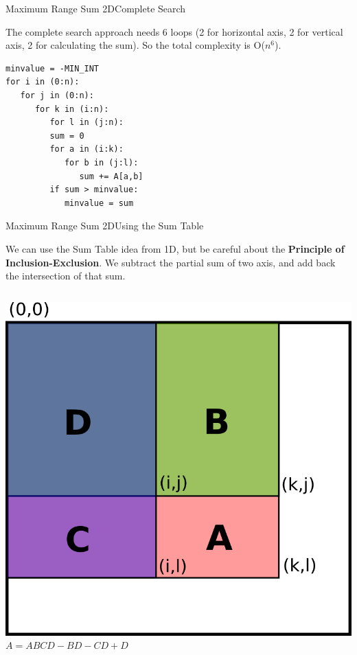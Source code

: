 \begin{frame}[fragile]{Maximum Range Sum 2D}{Complete Search}

\begin{block}{}
  The complete search approach needs 6 loops (2 for horizontal axis, 2 for vertical axis, 2 for calculating the sum). So the total complexity is O($n^6$).
\end{block}

\begin{block}{}
{\smaller
\begin{verbatim}
minvalue = -MIN_INT
for i in (0:n):
   for j in (0:n):
      for k in (i:n):
         for l in (j:n):
         sum = 0
         for a in (i:k):
            for b in (j:l):
               sum += A[a,b]
         if sum > minvalue:
            minvalue = sum
\end{verbatim}
}
\end{block}
\end{frame}

\begin{frame}[fragile]{Maximum Range Sum 2D}{Using the Sum Table}

We can use the Sum Table idea from 1D, but be careful about the {\bf Principle of Inclusion-Exclusion}. We subtract the partial sum of two axis, and add back the intersection of that sum.
\bigskip

\begin{columns}
  \hfill\includegraphics[width=.6\textwidth]{img/inclusion_exclusion}
  $A = ABCD - BD - CD + D$
\end{columns}

\end{frame}

